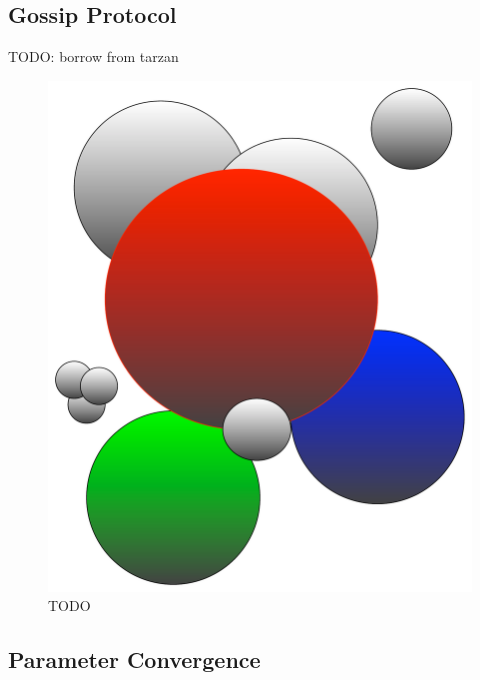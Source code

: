 \subsection{Gossip Protocol}
TODO: borrow from tarzan

\begin{figure}[ht!]
\begin{center}
\includegraphics[scale=0.25]{./images/boomerang_clusters.pdf}
\caption{TODO}
\label{fig:boomerang_clusters}
\end{center}
\end{figure}

\subsection{Parameter Convergence}

